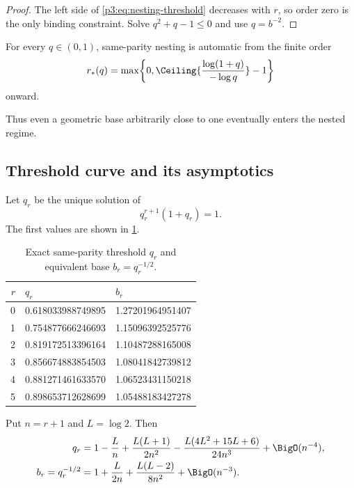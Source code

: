 \documentclass[11pt]{article}
\numberwithin{equation}{section}
\theoremstyle{definition}
\theoremstyle{remark}
\begin{document}
\begin{proof}
The left side of \eqref{p3:eq:nesting-threshold} decreases with $r$, so order zero is the only
binding constraint.  Solve $q^2+q-1\le0$ and use $q=b^{-2}$.
\end{proof}

\begin{corollary}\label{p3:cor:first-order}
For every $q\in(0,1)$, same-parity nesting is automatic from the finite order
\begin{equation}
 r_*(q)=\max\!\left\{0,
 \Ceiling{\frac{\log(1+q)}{-\log q}}-1\right\}
 \label{p3:eq:rstar}
\end{equation}
onward.
\end{corollary}

Thus even a geometric base arbitrarily close to one eventually enters the nested regime.

\subsection{Threshold curve and its asymptotics}

Let $q_r$ be the unique solution of
\begin{equation}
 q_r^{r+1}(1+q_r)=1.
 \label{p3:eq:qrdef}
\end{equation}
The first values are shown in \cref{p3:tab:thresholds}.

\begin{table}[htbp]
\centering
\caption{Exact same-parity threshold $q_r$ and equivalent base $b_r=q_r^{-1/2}$.}
\label{p3:tab:thresholds}
\begin{tabular}{@{}rll@{}}
\toprule
$r$ & $q_r$ & $b_r$\\
\midrule
0 & 0.618033988749895 & 1.27201964951407\\
1 & 0.754877666246693 & 1.15096392525776\\
2 & 0.819172513396164 & 1.10487288165008\\
3 & 0.856674883854503 & 1.08041842739812\\
4 & 0.881271461633570 & 1.06523431150218\\
5 & 0.898653712628699 & 1.05488183427278\\
\bottomrule
\end{tabular}
\end{table}

\begin{proposition}\label{p3:prop:threshold-asymptotic}
Put $n=r+1$ and $L=\log2$.  Then
\begin{align}
 q_r
 &=1-\frac{L}{n}+\frac{L(L+1)}{2n^2}
   -\frac{L(4L^2+15L+6)}{24n^3}+\BigO(n^{-4}),
 \label{p3:eq:qr-asymptotic}\\
 b_r=q_r^{-1/2}
 &=1+\frac{L}{2n}+\frac{L(L-2)}{8n^2}+\BigO(n^{-3}).
 \label{p3:eq:br-asymptotic}
\end{align}
\end{proposition}
\end{document}
